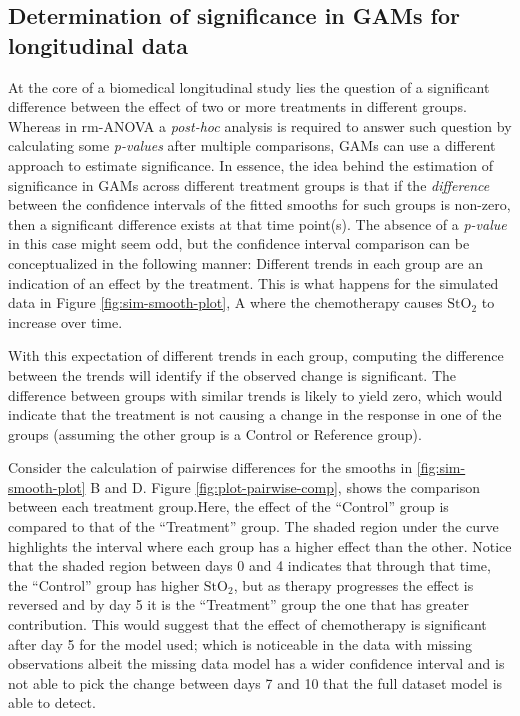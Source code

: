 \documentclass[
]{article}
\begin{document}
\hypertarget{determination-of-significance-in-gams-for-longitudinal-data}{%
\subsection{Determination of significance in GAMs for longitudinal data}\label{determination-of-significance-in-gams-for-longitudinal-data}}

At the core of a biomedical longitudinal study lies the question of a significant difference between the effect of two or more treatments in different groups. Whereas in rm-ANOVA a \emph{post-hoc} analysis is required to answer such question by calculating some \emph{p-values} after multiple comparisons, GAMs can use a different approach to estimate significance. In essence, the idea behind the estimation of significance in GAMs across different treatment groups is that if the \emph{difference} between the confidence intervals of the fitted smooths for such groups is non-zero, then a significant difference exists at that time point(s). The absence of a \emph{p-value} in this case might seem odd, but the confidence interval comparison can be conceptualized in the following manner: Different trends in each group are an indication of an effect by the treatment. This is what happens for the simulated data in Figure \ref{fig:sim-smooth-plot}, A where the chemotherapy causes \(\mbox{StO}_2\) to increase over time.

With this expectation of different trends in each group, computing the difference between the trends will identify if the observed change is significant. The difference between groups with similar trends is likely to yield zero, which would indicate that the treatment is not causing a change in the response in one of the groups (assuming the other group is a Control or Reference group).

Consider the calculation of pairwise differences for the smooths in \ref{fig:sim-smooth-plot} B and D. Figure \ref{fig:plot-pairwise-comp}, shows the comparison between each treatment group.Here, the effect of the ``Control'' group is compared to that of the ``Treatment'' group. The shaded region under the curve highlights the interval where each group has a higher effect than the other. Notice that the shaded region between days 0 and 4 indicates that through that time, the ``Control'' group has higher \(\mbox{StO}_2\), but as therapy progresses the effect is reversed and by day 5 it is the ``Treatment'' group the one that has greater contribution. This would suggest that the effect of chemotherapy is significant after day 5 for the model used; which is noticeable in the data with missing observations albeit the missing data model has a wider confidence interval and is not able to pick the change between days 7 and 10 that the full dataset model is able to detect.
\end{document}
